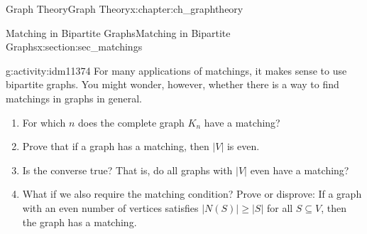 \documentclass[oneside,10pt,]{book}
\numberwithin{equation}{chapter}
\newcommand{\card}[1]{\left| #1 \right|}
\begin{document}
\begin{chapterptx}{Graph Theory}{}{Graph Theory}{}{}{x:chapter:ch_graphtheory}
\begin{sectionptx}{Matching in Bipartite Graphs}{}{Matching in Bipartite Graphs}{}{}{x:section:sec_matchings}
\begin{activity}{}{g:activity:idm11374}%
For many applications of matchings, it makes sense to use bipartite graphs. You might wonder, however, whether there is a way to find matchings in graphs in general.%
\begin{enumerate}[font=\bfseries,label=(\alph*),ref=\alph*]
\item{}For which \(n\) does the complete graph \(K_n\) have a matching?%
\item{}Prove that if a graph has a matching, then \(\card{V}\) is even.%
\item{}Is the converse true?  That is, do all graphs with \(\card{V}\) even have a matching?%
\item{}What if we also require the matching condition?  Prove or disprove: If a graph with an even number of vertices satisfies \(\card{N(S)} \ge \card{S}\) for all \(S \subseteq V\), then the graph has a matching.%
\end{enumerate}
\end{activity}
\end{sectionptx}
\end{chapterptx}
%
%
%
%
\typeout{************************************************}
\typeout{************************************************}
%
%
\appendix
%
\end{document}
